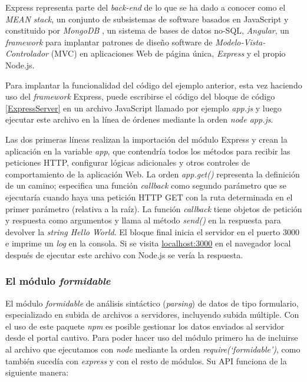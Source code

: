 Express representa parte del \emph{back-end} de lo que se ha dado a conocer como el \emph{\acrshort{MEAN} stack}, un conjunto de subsistemas de software basados en JavaScript y constituido por \emph{MongoDB} \cite{MongoDB}, un sistema de bases de datos no-SQL, \emph{Angular}, un \emph{framework} para implantar patrones de diseño software de \emph{Modelo-Vista-Controlador} (MVC) en aplicaciones Web de página única, \emph{Express} y el propio Node.js.

Para implantar la funcionalidad del código del ejemplo anterior, esta vez haciendo uso del \emph{framework} Express, puede escribirse el código del bloque de código \ref{ExpressServer} en un archivo JavaScript llamado por ejemplo \emph{app.js} y luego ejecutar este archivo en la línea de órdenes mediante la orden \emph{node app.js}.



Las dos primeras líneas realizan la importación del módulo Express y crean la aplicación en la variable \emph{app}, que contendría todos los métodos para recibir las peticiones HTTP, configurar lógicas adicionales y otros controles de comportamiento de la aplicación Web. La orden \emph{app.get()} representa la definición de un camino; especifica una función \emph{callback} como segundo parámetro que se ejecutaría cuando haya una petición HTTP GET con la ruta determinada en el primer parámetro (relativa a la raíz). La función \emph{callback} tiene objetos de petición y respuesta como argumentos y llama al método \emph{send()} en la respuesta para devolver la \emph{string Hello World}. El bloque final inicia el servidor en el puerto 3000 e imprime un \emph{log} en la consola. Si se visita \url{localhost:3000} en el navegador local después de ejecutar este archivo con Node.js se vería la respuesta.

\subsubsection{El módulo \emph{formidable}}
El módulo \emph{formidable} de análisis sintáctico (\emph{parsing}) de datos de tipo formulario, especializado en subida de archivos a servidores, incluyendo subida múltiple. Con el uso de este paquete \emph{npm} es posible gestionar los datos enviados al servidor desde el portal cautivo.
Para poder hacer uso del módulo primero ha de incluirse al archivo que ejecutamos con \emph{node} mediante la orden \emph{require(‘formidable’)}, como también sucedía con \emph{express} y con el resto de módulos. Su API funciona de la siguiente manera:

